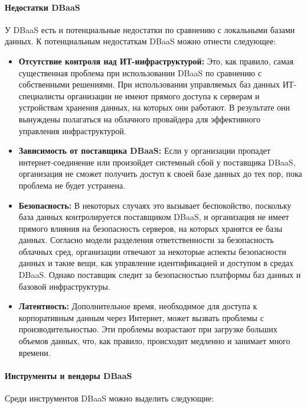 \paragraph{Недостатки DBaaS}

У DBaaS есть и потенциальные недостатки по сравнению с локальными базами данных. К потенциальным недостаткам DBaaS можно отнести следующее:

\begin{itemize}
\item \textbf{Отсутствие контроля над ИТ-инфраструктурой:} Это, как правило, самая существенная проблема при использовании DBaaS по сравнению с собственными решениями. При использовании управляемых баз данных ИТ-специалисты организации не имеют прямого доступа к серверам и устройствам хранения данных, на которых они работают. В результате они вынуждены полагаться на облачного провайдера для эффективного управления инфраструктурой.
\item \textbf{Зависимость от поставщика DBaaS:} Если у организации пропадет интернет-соединение или произойдет системный сбой у поставщика DBaaS, организация не сможет получить доступ к своей базе данных до тех пор, пока проблема не будет устранена.
\item \textbf{Безопасность:} В некоторых случаях это вызывает беспокойство, поскольку база данных контролируется поставщиком DBaaS, и организация не имеет прямого влияния на безопасность серверов, на которых хранятся ее базы данных. Согласно модели разделения ответственности за безопасность облачных сред, организации отвечают за некоторые аспекты безопасности данных и такие вещи, как управление идентификацией и доступом в средах DBaaS. Однако поставщик следит за безопасностью платформы баз данных и базовой инфраструктуры.
\item \textbf{Латентность:} Дополнительное время, необходимое для доступа к корпоративным данным через Интернет, может вызвать проблемы с производительностью. Эти проблемы возрастают при загрузке больших объемов данных, что, как правило, происходит медленно и занимает много времени.
\end{itemize}

\paragraph{Инструменты и вендоры DBaaS}

Среди инструментов DBaaS можно выделить следующие: \autocite{DBaaS}

